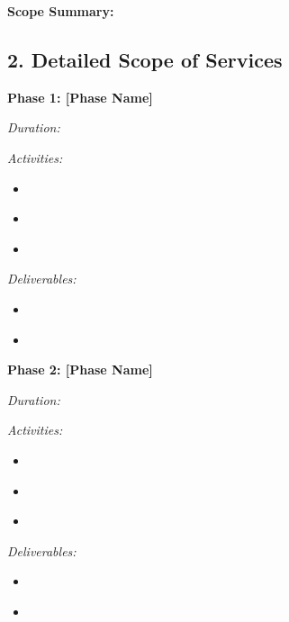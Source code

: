 \documentclass[11pt,a4paper]{article}
\begin{document}
\textbf{Scope Summary:} \underline{\hspace{10cm}}

\underline{\hspace{12cm}}

\underline{\hspace{12cm}}

\subsection*{2. Detailed Scope of Services}

\textbf{Phase 1: [Phase Name]}

\textit{Duration:} \underline{\hspace{4cm}}

\textit{Activities:}
\begin{itemize}
\item[] \underline{\hspace{12cm}}
\item[] \underline{\hspace{12cm}}
\item[] \underline{\hspace{12cm}}
\end{itemize}

\textit{Deliverables:}
\begin{itemize}
\item[] \underline{\hspace{12cm}}
\item[] \underline{\hspace{12cm}}
\end{itemize}

\textbf{Phase 2: [Phase Name]}

\textit{Duration:} \underline{\hspace{4cm}}

\textit{Activities:}
\begin{itemize}
\item[] \underline{\hspace{12cm}}
\item[] \underline{\hspace{12cm}}
\item[] \underline{\hspace{12cm}}
\end{itemize}

\textit{Deliverables:}
\begin{itemize}
\item[] \underline{\hspace{12cm}}
\item[] \underline{\hspace{12cm}}
\end{itemize}
\end{document}
